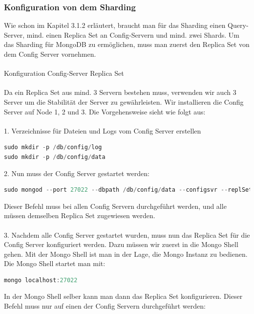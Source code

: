 \subsubsection{Konfiguration von dem Sharding}
Wie schon im Kapitel 3.1.2 erl\"autert, braucht man f\"ur das Sharding einen Query-Server, mind. einen Replica Set an Config-Servern und mind. zwei Shards. Um das Sharding f\"ur MongoDB zu erm\"oglichen, muss man zuerst den Replica Set von dem Config Server vornehmen.
\\
\\
Konfiguration Config-Server Replica Set
\\
\\
Da ein Replica Set aus mind. 3 Servern bestehen muss, verwenden wir auch 3 Server um die Stabilit\"at der Server zu gew\"ahrleisten. Wir installieren die Config Server auf Node 1, 2 und 3. Die Vorgehensweise sieht wie folgt aus:
\\
\\
1.	Verzeichnisse f\"ur Dateien und Logs vom Config Server erstellen
\begin{lstlisting}[caption={Erstellung der Verzeichnisse}, language=java,captionpos=t,numbers=none, numberstyle=\tiny,basicstyle=\scriptsize,breaklines=true]
sudo mkdir -p /db/config/log
sudo mkdir -p /db/config/data
\end{lstlisting}
2.	Nun muss der Config Server gestartet werden:
\begin{lstlisting}[caption={Starten von einem Config Server}, language=java,captionpos=t,numbers=none, numberstyle=\tiny,basicstyle=\scriptsize,breaklines=true]
sudo mongod --port 27022 --dbpath /db/config/data --configsvr --replSet abDBcs --fork --logpath /db/config/log/mongodb.log
\end{lstlisting}
Dieser Befehl muss bei allen Config Servern durchgef\"uhrt werden, und alle m\"ussen demselben Replica Set zugewiesen werden.
\\
\\
3.	Nachdem alle Config Server gestartet wurden, muss nun das Replica Set f\"ur die Config Server konfiguriert werden. Dazu m\"ussen wir zuerst in die Mongo Shell gehen. Mit der Mongo Shell ist man in der Lage, die Mongo Instanz zu bedienen. Die Mongo Shell startet man mit: 
\begin{lstlisting}[caption={Mongo Shell für den Config Server starten}, language=java,captionpos=t,numbers=none, numberstyle=\tiny,basicstyle=\scriptsize,breaklines=true]
mongo localhost:27022
\end{lstlisting}
In der Mongo Shell selber kann man dann das Replica Set konfigurieren. Dieser Befehl muss nur auf einen der Config Servern durchgef\"uhrt werden:
